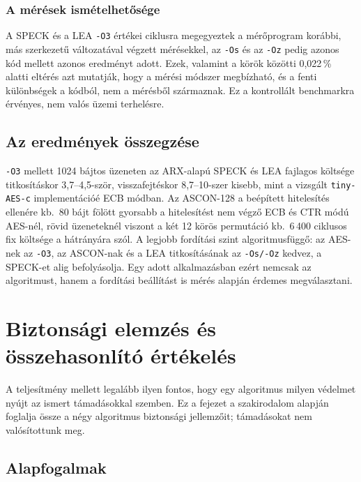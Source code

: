 \documentclass[a4paper,12pt]{report}
\theoremstyle{definition}
\theoremstyle{remark}
\begin{document}
\subsection{A mérések ismételhetősége}

A SPECK és a LEA \texttt{-O3} értékei ciklusra megegyeztek a mérőprogram korábbi, más szerkezetű változatával végzett mérésekkel, az \texttt{-Os} és az \texttt{-Oz} pedig azonos kód mellett azonos eredményt adott. Ezek, valamint a körök közötti 0,022\,\% alatti eltérés azt mutatják, hogy a mérési módszer megbízható, és a fenti különbségek a kódból, nem a mérésből származnak. Ez a kontrollált benchmarkra érvényes, nem valós üzemi terhelésre.

\section{Az eredmények összegzése}\label{sec:osszesites}

\texttt{-O3} mellett 1024 bájtos üzeneten az ARX-alapú SPECK és LEA fajlagos költsége titkosításkor 3,7--4,5-ször, visszafejtéskor 8,7--10-szer kisebb, mint a vizsgált \texttt{tiny-AES-c} implementációé ECB módban. Az ASCON-128 a beépített hitelesítés ellenére kb.\ 80 bájt fölött gyorsabb a hitelesítést nem végző ECB és CTR módú AES-nél, rövid üzeneteknél viszont a két 12 körös permutáció kb.\ 6\,400 ciklusos fix költsége a hátrányára szól. A legjobb fordítási szint algoritmusfüggő: az AES-nek az \texttt{-O3}, az ASCON-nak és a LEA titkosításának az \texttt{-Os/-Oz} kedvez, a SPECK-et alig befolyásolja. Egy adott alkalmazásban ezért nemcsak az algoritmust, hanem a fordítási beállítást is mérés alapján érdemes megválasztani.

\chapter{Biztonsági elemzés és összehasonlító értékelés}\label{chap:biztonsag}

A teljesítmény mellett legalább ilyen fontos, hogy egy algoritmus milyen védelmet nyújt az ismert támadásokkal szemben. Ez a fejezet a szakirodalom alapján foglalja össze a négy algoritmus biztonsági jellemzőit; támadásokat nem valósítottunk meg.

\section{Alapfogalmak}\label{sec:kriptoanalizis_alap}
\end{document}
